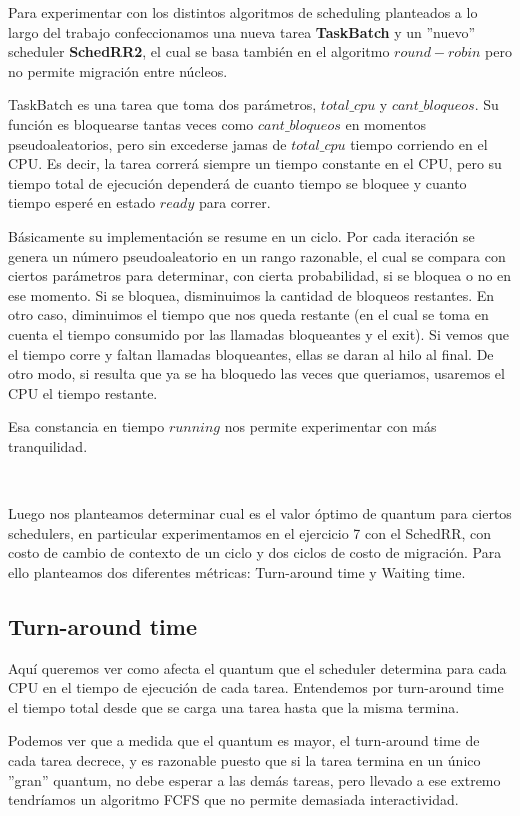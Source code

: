 Para experimentar con los distintos algoritmos de scheduling planteados a lo largo del trabajo confeccionamos una nueva tarea 
\textbf{TaskBatch} y un ''nuevo'' scheduler \textbf{SchedRR2}, el cual se basa también en el algoritmo $round-robin$ pero no permite migración entre núcleos.

TaskBatch es una tarea que toma dos parámetros, $total\_cpu$ y $cant\_bloqueos$. Su función es bloquearse tantas veces como $cant\_bloqueos$ en momentos pseudoaleatorios, pero sin excederse jamas de $total\_cpu$ tiempo corriendo en el CPU. Es decir, la tarea correrá siempre un tiempo constante en el CPU, pero su tiempo total de ejecución dependerá de cuanto tiempo se bloquee y cuanto tiempo esperé en estado $ready$ para correr.

Básicamente su implementación se resume en un ciclo. Por cada iteración se genera un número pseudoaleatorio en un rango razonable, el cual se compara con ciertos parámetros para determinar, con cierta probabilidad, si se bloquea o no en ese momento. Si se bloquea, disminuimos la cantidad de bloqueos restantes. En otro caso, diminuimos el tiempo que nos queda restante (en el cual se toma en cuenta el tiempo consumido por las llamadas bloqueantes y el exit). Si vemos que el tiempo corre y faltan llamadas bloqueantes, ellas se daran al hilo al final. De otro modo, si resulta que ya se ha bloquedo las veces que queriamos, usaremos el CPU el tiempo restante.

Esa constancia en tiempo $running$ nos permite experimentar con más tranquilidad.

~

Luego nos planteamos determinar cual es el valor óptimo de quantum para ciertos schedulers, en particular experimentamos en el ejercicio 7 con el SchedRR, con costo de cambio de contexto de un ciclo y dos ciclos de costo de migración. Para ello planteamos dos diferentes métricas: Turn-around time y Waiting time.

\subsection{Turn-around time}

Aquí queremos ver como afecta el quantum que el scheduler determina para cada CPU en el tiempo de ejecución de cada tarea.
Entendemos por turn-around time el tiempo total desde que se carga una tarea hasta que la misma termina.

Podemos ver que a medida que el quantum es mayor, el turn-around time de cada tarea decrece, y es razonable puesto que si la tarea termina en un único ''gran'' quantum, no debe esperar a las demás tareas, pero llevado a ese extremo tendríamos un algoritmo FCFS que no permite demasiada interactividad.

